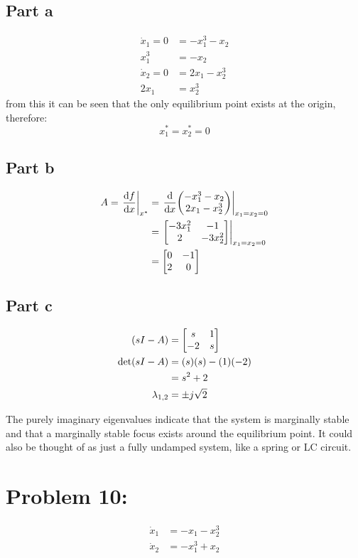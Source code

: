\documentclass[]{article}
\begin{document}
\subsection{Part a}
\begin{align*}
	\dot{x}_1 = 0 &= -x_1^3 -x_2\\
	x_1^3 &= -x_2\\
	\dot{x}_2 = 0 &= 2x_1 -x_2^3\\
	2 x_1 &= x_2^3
\end{align*}
from this it can be seen that the only equilibrium point exists at the origin, therefore:
\begin{displaymath}
	x_1^* = x_2^* = 0
\end{displaymath}

\subsection{Part b}
\begin{align*}
	A = \eval{\dv{f}{x}}_{x^*} &= \eval{\dv{x} \mqty(-x_1^3 -x_2\\ 2x_1 -x_2^3)}_{x_1=x_2=0}\\
	&= \eval{\mqty[-3x_1^2 & -1\\ 2& -3x_2^2]}_{x_1=x_2=0}\\
	&= \mqty[0&-1\\ 2 & 0]
\end{align*}

\subsection{Part c}
\begin{align*}
	(sI - A)
	&= \mqty[s & 1\\ -2 & s]\\
	\det(sI-A)
	&= (s)(s) - (1)(-2)\\
	&= s^2 + 2\\
	\lambda_{1,2}
	&= \pm j \sqrt{2}
\end{align*}

The purely imaginary eigenvalues indicate that the system is marginally stable and that a marginally stable focus exists around the equilibrium point. It could also be thought of as just a fully undamped system, like a spring or LC circuit.

\newpage
\section{Problem 10:}
\begin{align*}
	\dot{x}_1 &= -x_1 -x_2^3\\
	\dot{x}_2 &= -x_1^3 + x_2
\end{align*}
\end{document}
